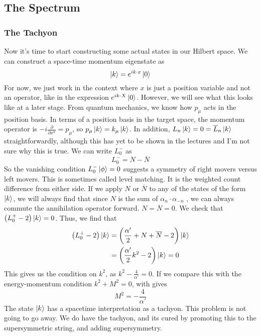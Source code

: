 \documentclass[11pt, oneside]{article}   	%
\theoremstyle{slanted}
\begin{document}
\subsection{The Spectrum}

\subsubsection{The Tachyon}
Now it's time to start constructing 
some actual states in our Hilbert space. 
We can construct a space-time momentum 
eigenstate as 
\[
\ket{ k }  = e ^{  i k \cdot  x } \ket{0} 
\] For now, we just work in the 
context where $ x $ is just a position variable 
and not an operator, like in the expression $ e^{ i k \cdot  X } \ket{ 0 } $. 
However, we will see what this looks like 
at a later stage. 
From quantum mechanics, we know 
how $ p_ \mu $ acts  in the position basis. In terms of a position basis in 
the target space, the 
momentum operator is $  -i \frac{\partial   }{\partial  x ^ u }  
 = p _ \mu $, so 
 $ p _ \mu \ket{ k }  = k _ \mu \ket{ k } $. 
 In addition, $ L _ n \ket{ k }  = 0  = \overline{ L } _ n \ket{ k } $
 straightforwardly, although this 
 has yet  to be shown in the lectures and I'm not sure why 
 this is true. 
 We can write $ L_0 ^ -  $ as 
 \[
 L_0 ^  -  = N - \overline{ N } 
 \] So the vanishing condition 
 $ L_0 ^  - \ket{ \phi }  = 0 $
 suggests a symmetry of 
 right movers versus left movers. 
 This is sometimes called level matching. 
 It is the weighted count difference from 
 either side. 
 If we apply $ N $ or $\overline{ N } $ 
 to any of the states of the form $ \ket{ k } $, 
 we will always find that since $ N $ is the sum 
 of $ \alpha _ n \cdot  \alpha _{ - n } $ , we 
 can always commute the annihilation operator forward.
 $ N  = \overline{ N }  = 0  $. 
 We check that $ \left( L _ 0 ^ +   -2  \right)  \ket{ k } =0   $. 
 Thus, we find that 
 \begin{align*}
	 \left( L_0 ^ +  - 2  \right)  \ket{ k} &=  
	 \left( \frac{\alpha  ' }{ 2 } + N + \overline{ N }  - 2  \right)  \ket{ k } \\
						&=  \left( 
						\frac{\alpha ' }{  2 }
					k ^ 2 - 2  \right)  \ket{ k } = 0  \\
 \end{align*} 
 This gives 
		us the condition on $ k ^ 2  $, as $ k ^ 2   - \frac{4}{\alpha ' }  = 0 $. 
		If we compare this with the energy-momentum condition 
		$ k ^ 2 + M ^ 2   =0  $, 
		with gives 
		\[
		 M ^ 2  =  - \frac{4}{\alpha ' } 
		\]
The state $ \ket{ k } $ has a spacetime interpretation as a tachyon. 
This problem is 
not going to go away. 
We do have the tachyon, and its 
cured by promoting this to the supersymmetric 
string, and adding supersymmetry. 
\end{document}
